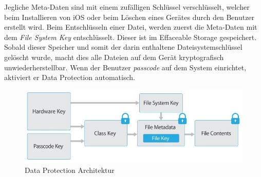 		Jegliche Meta-Daten sind mit einem zufälligen Schlüssel verschlüsselt, welcher
		beim Installieren von iOS oder beim Löschen eines Gerätes durch den Benutzer
		erstellt wird. Beim Entschlüsseln einer Datei, werden zuerst die Meta-Daten
		mit dem \textsl{File System Key} entschlüsselt. Dieser ist im Effaceable Storage
		gespeichert.
		Sobald dieser Speicher und somit der darin enthaltene Dateisystemschlüssel
		gelöscht wurde, macht dies alle Dateien auf dem Gerät kryptografisch
		unwiederherstellbar. Wenn der Benutzer \textsl{passcode} auf dem System
		einrichtet, aktiviert er Data Protection automatisch.
		\begin{figure}[h]
			\centering
			\includegraphics[width=0.9\linewidth]{ios/media/data-protection.jpg}
			\caption{Data Protection Architektur 
			\cite[S. 10]{iOSSecurityApr2015}}
			\label{fig:data-protection}
		\end{figure}
